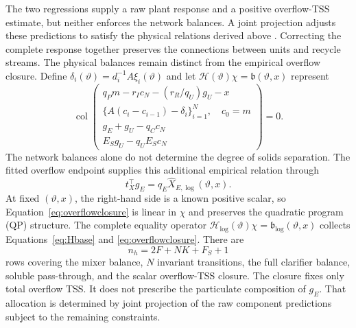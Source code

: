 \documentclass[a4paper,fleqn]{cas-sc}
\newcommand{\col}{\operatorname{col}}
\begin{document}
The two regressions supply a raw plant response and a positive overflow-TSS estimate, but neither enforces the network balances. A joint projection adjusts these predictions to satisfy the physical relations derived above \citep{KircherVotsmeier2025,Valente2025}. Correcting the complete response together preserves the connections between units and recycle streams. The physical balances remain distinct from the empirical overflow closure. Define $\delta_i(\vartheta)=d_i^{-1}A\xi_i(\vartheta)$ and let $\mathcal H(\vartheta)\chi=\mathfrak b(\vartheta,x)$ represent
\begin{equation}
\col\!\left(
\begin{array}{c}
q_Pm-r_Ic_N-(r_R/q_U)g_U-x\\
\{A(c_i-c_{i-1})-\delta_i\}_{i=1}^{N},\quad c_0=m\\
g_E+g_U-q_Cc_N\\
E_Sg_U-q_UE_Sc_N
\end{array}\right)=0.
\label{eq:Hbase}
\end{equation}
The network balances alone do not determine the degree of solids separation. The fitted overflow endpoint supplies this additional empirical relation through
\begin{equation}
t_X^\top g_E=q_E\widehat X_{E,\log}(\vartheta,x).
\label{eq:overflowclosure}
\end{equation}
At fixed $(\vartheta,x)$, the right-hand side is a known positive scalar, so Equation~\eqref{eq:overflowclosure} is linear in $\chi$ and preserves the quadratic program (QP) structure. The complete equality operator $\mathcal H_{\log}(\vartheta)\chi=\mathfrak b_{\log}(\vartheta,x)$ collects Equations~\eqref{eq:Hbase} and \eqref{eq:overflowclosure}. There are
\begin{equation}
n_h=2F+NK+F_S+1
\label{eq:eqcount}
\end{equation}
rows covering the mixer balance, $N$ invariant transitions, the full clarifier balance, soluble pass-through, and the scalar overflow-TSS closure. The closure fixes only total overflow TSS. It does not prescribe the particulate composition of $g_E$. That allocation is determined by joint projection of the raw component predictions subject to the remaining constraints.
\end{document}
